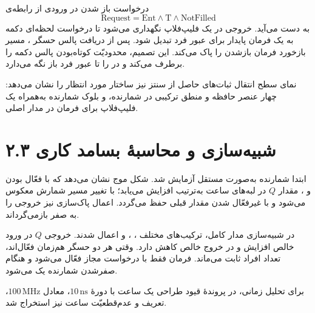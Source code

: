 \documentclass[12pt,a4paper]{article}
\begin{document}
	درخواست باز شدن در ورودی از رابطه‌ی
	\[
		\mathrm{Request}=\mathrm{Ent}\land\mathrm{T}\land\mathrm{NotFilled}
	\]
	به دست می‌آید. خروجی  در یک فلیپ‌فلاپ  نگهداری می‌شود تا درخواست لحظه‌ای دکمه به یک فرمان پایدار برای عبور فرد تبدیل شود. پس از دریافت پالس حسگر ، مسیر بازخورد فرمان بازشدن را پاک می‌کند. این تصمیم، محدودیّت کوتاه‌بودن پالس دکمه را برطرف می‌کند و در را تا عبور فرد باز نگه می‌دارد.


	نمای سطح انتقال ثبات‌های حاصل از سنتز نیز ساختار مورد انتظار را نشان می‌دهد: چهار عنصر حافظه و منطق ترکیبی در شمارنده، و بلوک شمارنده به‌همراه یک فلیپ‌فلاپ برای فرمان  در مدار اصلی.


	\section*{۲.۳ شبیه‌سازی و محاسبهٔ بسامد کاری}
	ابتدا شمارنده به‌صورت مستقل آزمایش شد. شکل موج نشان می‌دهد که با فعّال بودن  و ، مقدار \(Q\) در لبه‌های ساعت به‌ترتیب افزایش می‌یابد؛ با تغییر  مسیر شمارش معکوس می‌شود و با غیرفعّال شدن  مقدار قبلی حفظ می‌گردد. اعمال پاک‌سازی نیز خروجی را به صفر بازمی‌گرداند.


	در شبیه‌سازی مدار کامل، ترکیب‌های مختلف ، ،  و  اعمال شدند. خروجی \(Q\) در ورود خالص افزایش و در خروج خالص کاهش دارد. وقتی هر دو حسگر هم‌زمان فعّال‌اند، تعداد افراد ثابت می‌ماند. فرمان  فقط با درخواست مجاز فعّال می‌شود و  هنگام صفرشدن شمارنده یک می‌شود.


	برای تحلیل زمانی، در پروندهٔ قیود طراحی یک ساعت با دورهٔ \(10\,\mathrm{ns}\)، معادل \(100\,\mathrm{MHz}\)، تعریف و عدم‌قطعیّت ساعت نیز استخراج شد.

\end{document}
